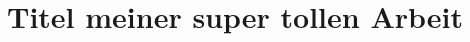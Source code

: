 \documentclass{scrreprt}
\title{Titel meiner super tollen Arbeit}
\begin{document}
\makeWhsThesisTitle
\makeStatutoryDeclaration

\clearpage
\lipsum
\end{document}
